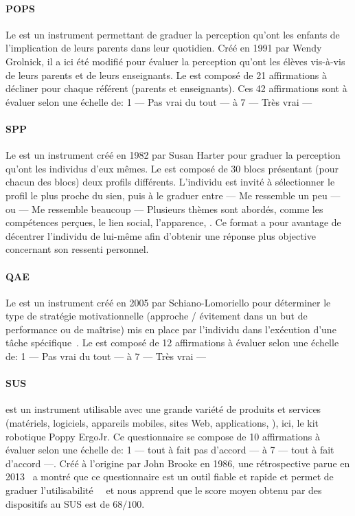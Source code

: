     \paragraph{POPS}
    Le  est un instrument permettant de graduer la perception qu’ont les enfants de l’implication de leurs parents dans leur quotidien. Créé en 1991 par Wendy Grolnick, il a ici été modifié pour évaluer la perception qu’ont les élèves vis-à-vis de leurs parents et de leurs enseignants. Le  est composé de 21 affirmations à décliner pour chaque référent (parents et enseignants). Ces 42 affirmations sont à évaluer selon une échelle de: 1 — Pas vrai du tout — à 7 — Très vrai —~
    \paragraph{SPP}
    Le  est un instrument créé en 1982 par Susan Harter pour graduer la perception qu’ont les individus d’eux mêmes. Le  est composé de 30 blocs présentant (pour chacun des blocs) deux profils différents. L’individu est invité à sélectionner le profil le plus proche du sien, puis à le graduer entre — Me ressemble un peu — ou — Me ressemble beaucoup — Plusieurs thèmes sont abordés, comme les compétences perçues, le lien social, l’apparence, \etc. Ce format a pour avantage de décentrer l'individu de lui-même afin d'obtenir une réponse plus objective concernant son ressenti personnel.~
    \paragraph{QAE}
    Le  est un instrument créé en 2005 par Schiano-Lomoriello pour déterminer le type de stratégie motivationnelle (approche / évitement dans un but de performance ou de maîtrise) mis en place par l’individu dans l’exécution d’une tâche spécifique~. Le  est composé de 12 affirmations à évaluer selon une échelle de: 1 — Pas vrai du tout — à 7 — Très vrai —~
    \paragraph{SUS}\label{q:sus}
     est un instrument utilisable avec une grande variété de produits et services (matériels, logiciels, appareils mobiles, sites Web, applications, \etc), ici, le kit robotique Poppy ErgoJr. Ce questionnaire se compose de 10 affirmations à évaluer selon une échelle de: 1 — tout à fait pas d’accord — à 7 — tout à fait d’accord —. Créé à l’origine par John Brooke en 1986, une rétrospective parue en 2013~ a montré que ce questionnaire est un outil fiable et rapide et permet de graduer l'utilisabilité~~ et nous apprend que le score moyen obtenu par des dispositifs au SUS est de $68/100$.~
